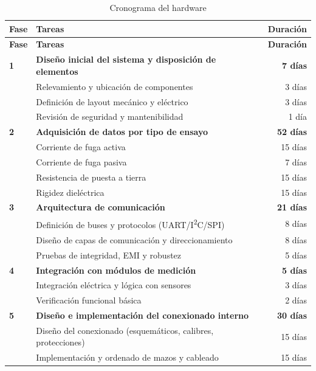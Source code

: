 \begin{longtable}{@{} l p{8.5cm} r @{}}
\caption{Cronograma del hardware}\label{tab:cronograma_hw}\\
\toprule
\textbf{Fase} & \textbf{Tareas} & \textbf{Duración} \\
\midrule
\endfirsthead
\toprule
\textbf{Fase} & \textbf{Tareas} & \textbf{Duración} \\
\midrule
\endhead
\textbf{1} & \textbf{Diseño inicial del sistema y disposición de elementos}
           & \textbf{7 días} \\
  & Relevamiento y ubicación de componentes          & 3 días \\
  & Definición de layout mecánico y eléctrico        & 3 días \\
  & Revisión de seguridad y mantenibilidad           & 1 día \\
\midrule
\textbf{2} & \textbf{Adquisición de datos por tipo de ensayo} & \textbf{52 días} \\
  & Corriente de fuga activa                         & 15 días \\
  & Corriente de fuga pasiva                         & 7 días \\
  & Resistencia de puesta a tierra                   & 15 días \\
  & Rigidez dieléctrica                              & 15 días \\
\midrule
\textbf{3} & \textbf{Arquitectura de comunicación}    & \textbf{21 días} \\
  & Definición de buses y protocolos (UART/I\textsuperscript{2}C/SPI) & 8 días \\
  & Diseño de capas de comunicación y direccionamiento & 8 días \\
  & Pruebas de integridad, EMI y robustez            & 5 días \\
\midrule
\textbf{4} & \textbf{Integración con módulos de medición} & \textbf{5 días} \\
  & Integración eléctrica y lógica con sensores      & 3 días \\
  & Verificación funcional básica                    & 2 días \\
\midrule
\textbf{5} & \textbf{Diseño e implementación del conexionado interno}
           & \textbf{30 días} \\
  & Diseño del conexionado (esquemáticos, calibres, protecciones) & 15 días \\
  & Implementación y ordenado de mazos y cableado    & 15 días \\

\end{longtable}
